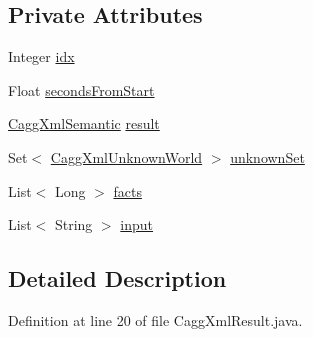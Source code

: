 \subsection*{Private Attributes}
\begin{DoxyCompactItemize}
\item 
Integer \hyperlink{classit_1_1emarolab_1_1cagg_1_1debugging_1_1result2XML_1_1CaggXmlResult_a2452a1fd408e37c3b7f76348a2c4c657}{idx}
\item 
Float \hyperlink{classit_1_1emarolab_1_1cagg_1_1debugging_1_1result2XML_1_1CaggXmlResult_ae7e5180b0239b507853d4dfe8e6b6708}{seconds\-From\-Start}
\item 
\hyperlink{classit_1_1emarolab_1_1cagg_1_1debugging_1_1result2XML_1_1CaggXmlSemantic}{Cagg\-Xml\-Semantic} \hyperlink{classit_1_1emarolab_1_1cagg_1_1debugging_1_1result2XML_1_1CaggXmlResult_a1f6de5aff3f9182bc5fb6d2e802912e5}{result}
\item 
Set$<$ \hyperlink{classit_1_1emarolab_1_1cagg_1_1debugging_1_1result2XML_1_1CaggXmlUnknownWorld}{Cagg\-Xml\-Unknown\-World} $>$ \hyperlink{classit_1_1emarolab_1_1cagg_1_1debugging_1_1result2XML_1_1CaggXmlResult_a473a71f574ff6e7a27f3b2338bc9eaa7}{unknown\-Set}
\item 
List$<$ Long $>$ \hyperlink{classit_1_1emarolab_1_1cagg_1_1debugging_1_1result2XML_1_1CaggXmlResult_a5faf0d79518d23bf0bec71ba43783684}{facts}
\item 
List$<$ String $>$ \hyperlink{classit_1_1emarolab_1_1cagg_1_1debugging_1_1result2XML_1_1CaggXmlResult_acf1e6dc3714265015153a140227cca3c}{input}
\end{DoxyCompactItemize}


\subsection{Detailed Description}


Definition at line 20 of file Cagg\-Xml\-Result.\-java.



